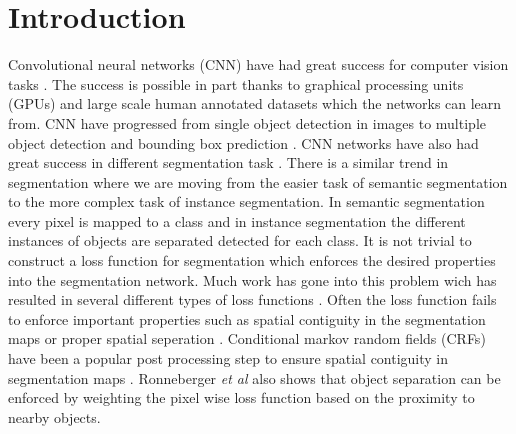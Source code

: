\documentclass{kththesis}
\begin{document}
\chapter{Introduction}
Convolutional neural networks (CNN) have had great success for computer vision tasks \parencite{sermanet_overfeat:_2013,zeiler_visualizing_2013,  simonyan_two-stream_2014, krizhevsky_imagenet_2012}.
The success is possible in part thanks to graphical processing units (GPUs) and large scale human annotated datasets which  the networks can learn from. CNN have progressed from single object detection in images \parencite{krizhevsky_learning_2009} to multiple object detection and bounding box prediction \parencite{lin_microsoft_2014}. CNN networks have also had great success in different segmentation task \parencite{garcia-garcia_review_2017}. There is a similar trend in segmentation where we are moving from the easier task of semantic segmentation to the more complex task of instance segmentation. In semantic segmentation every pixel is mapped to a class and in instance segmentation the different instances of objects are separated detected for each class. It is not trivial to construct a loss function for segmentation which enforces the desired properties into the segmentation network. Much work has gone into this problem wich has resulted in several different types of loss functions \parencite{ronneberger_u-net:_2015, yu_unitbox:_2016, rahman_optimizing_2016}. Often the loss function fails to enforce important properties such as spatial contiguity in the segmentation maps \parencite{luc_semantic_2016} or proper spatial seperation \parencite{audebert_segment-before-detect:_2017}. Conditional markov random fields (CRFs) have been a popular post processing step to ensure spatial contiguity in segmentation maps \parencite{zhao_classification_2007}. Ronneberger \textit{et al} \parencite{ronneberger_u-net:_2015} also shows that object separation can be enforced by weighting the pixel wise loss function based on the proximity to nearby objects.\\
\\
\end{document}
